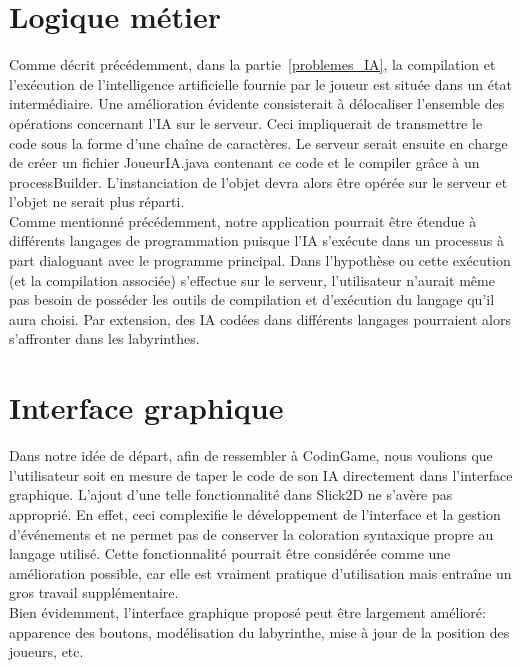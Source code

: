 \section{Logique métier}

	Comme décrit précédemment, dans la partie~\ref{problemes_IA}, la compilation et l'exécution de l'intelligence artificielle fournie par le joueur est située dans un état intermédiaire. Une amélioration évidente consisterait à délocaliser l'ensemble des opérations concernant l'IA sur le serveur. Ceci impliquerait de transmettre le code sous la forme d'une chaîne de caractères. Le serveur serait ensuite en charge de créer un fichier JoueurIA.java contenant ce code et le compiler grâce à un processBuilder. L'instanciation de l'objet devra alors être opérée sur le serveur et l'objet ne serait plus réparti. \\

	Comme mentionné précédemment, notre application pourrait être étendue à différents langages de programmation puisque l'IA s'exécute dans un processus à part dialoguant avec le programme principal. Dans l'hypothèse ou cette exécution (et la compilation associée) s'effectue sur le serveur, l'utilisateur n'aurait même pas besoin de posséder les outils de compilation et d'exécution du langage qu'il aura choisi. Par extension, des IA codées dans différents langages pourraient alors s'affronter dans les labyrinthes.


\section{Interface graphique}

  Dans notre idée de départ, afin de ressembler à CodinGame, nous voulions que l'utilisateur soit en mesure de taper le code de son IA directement dans l'interface graphique. L'ajout d'une telle fonctionnalité dans Slick2D ne s'avère pas approprié. En effet, ceci complexifie le développement de l'interface et la gestion d'événements et ne permet pas de conserver la coloration syntaxique propre au langage utilisé. Cette fonctionnalité pourrait être considérée comme une amélioration possible, car elle est vraiment pratique d'utilisation mais entraîne un gros travail supplémentaire. \\

  Bien évidemment, l'interface graphique proposé peut être largement amélioré: apparence des boutons, modélisation du labyrinthe, mise à jour de la position des joueurs, etc.
